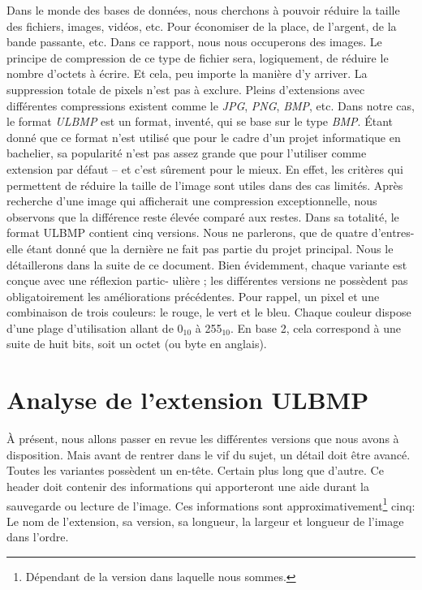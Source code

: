 \documentclass[utf8]{article}
\begin{document}
Dans le monde des bases de données, nous cherchons à pouvoir réduire la taille des fichiers, images, vidéos, etc. Pour économiser de la place, de l’argent, de la bande passante, etc. Dans ce rapport, nous nous occuperons des images. Le principe de compression de ce type de fichier sera, logiquement, de réduire le nombre d’octets à écrire. Et cela, peu importe la manière d’y arriver. La suppression totale de pixels n’est pas à exclure. Pleins d’extensions avec différentes compressions existent comme le \textit{JPG}, \textit{PNG}, \textit{BMP}, etc. Dans notre cas, le format \textit{ULBMP} est un format, inventé, qui se base sur le type \textit{BMP}. Étant donné que ce format n’est utilisé que pour le cadre d’un projet informatique en bachelier, sa popularité n’est pas assez grande que pour l’utiliser comme extension par défaut -- et c’est sûrement pour le mieux. En effet, les
critères qui permettent de réduire la taille de l’image sont utiles dans des cas limités. Après recherche d’une image qui afficherait une compression exceptionnelle, nous observons que la différence reste élevée comparé aux restes. Dans sa totalité, le format ULBMP contient cinq versions. Nous ne parlerons, que de quatre d’entres-elle étant donné que la dernière ne fait pas partie du projet principal. Nous le détaillerons dans la suite de ce document. Bien évidemment, chaque variante est conçue avec une réflexion partic-
ulière ; les différentes versions ne possèdent pas obligatoirement les améliorations précédentes.
Pour rappel, un pixel et une combinaison de trois couleurs: le rouge, le vert et le bleu. Chaque couleur dispose d’une plage d’utilisation allant de 0$_{10}$ à 255$_{10}$. En base 2, cela correspond à une suite de huit bits, soit un octet (ou byte en
anglais).

\section{Analyse de l'extension ULBMP}
À présent, nous allons passer en revue les différentes versions que nous avons à disposition. Mais avant de rentrer dans le vif du sujet, un détail doit être avancé. Toutes les variantes possèdent un en-tête. Certain plus long que d’autre. Ce header doit contenir des informations qui apporteront une aide durant la sauvegarde ou lecture de l’image. Ces informations sont approximativement\footnote{Dépendant de la version dans laquelle nous sommes.} cinq: Le nom de l’extension, sa version, sa longueur, la largeur et longueur de
l’image dans l’ordre.
\end{document}
